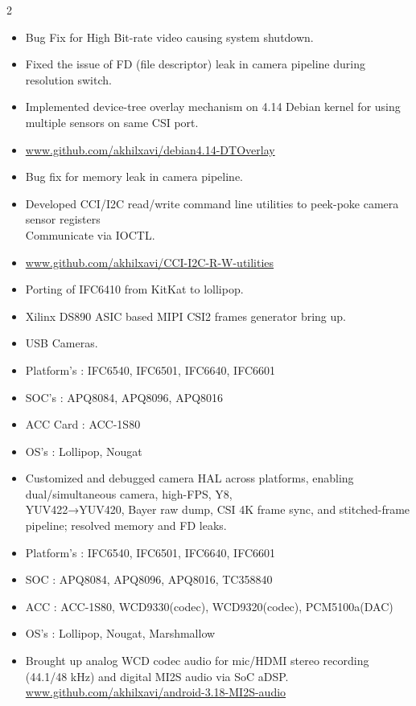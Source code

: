 \documentclass[10pt,a4paper,ragged2e,withhyper]{altacv}
\begin{document}
\begin{paracol}{2}
\begin{itemize}
\switchcolumn

    \item Bug Fix for High Bit-rate video causing system shutdown.
    \item Fixed the issue of FD (file descriptor) leak in camera pipeline during resolution switch.
    \item Implemented device-tree overlay mechanism on 4.14 Debian kernel for using multiple sensors on same CSI port.
    \item \href{www.github.com/akhilxavi/debian4.14-DTOverlay}{www.github.com/akhilxavi/debian4.14-DTOverlay}
    \item  Bug fix for memory leak in camera pipeline.
    \item  Developed CCI/I2C read/write command line utilities to peek-poke camera sensor registers\\
           Communicate via IOCTL.
    \item \href{www.github.com/akhilxavi/CCI-I2C-R-W-utilities}{www.github.com/akhilxavi/CCI-I2C-R-W-utilities}
    \item  Porting of IFC6410 from KitKat to lollipop.
    \item  Xilinx DS890 ASIC based MIPI CSI2 frames generator bring up.
    \item USB Cameras.
\end{itemize}

\begin{itemize}
    \item Platform’s : IFC6540, IFC6501, IFC6640, IFC6601
    \item SOC's : APQ8084, APQ8096, APQ8016
    \item ACC Card : ACC-1S80
    \item OS’s : Lollipop, Nougat
    \item Customized and debugged camera HAL across platforms, enabling dual/simultaneous camera, high-FPS, Y8, \\
          YUV422→YUV420, Bayer raw dump, CSI 4K frame sync, and stitched-frame pipeline; resolved memory and FD leaks.
\end{itemize}

\begin{itemize}
    \item Platform’s : IFC6540, IFC6501, IFC6640, IFC6601
    \item SOC : APQ8084, APQ8096, APQ8016, TC358840
    \item ACC : ACC-1S80, WCD9330(codec), WCD9320(codec), PCM5100a(DAC)
    \item OS’s : Lollipop, Nougat, Marshmallow
    \item Brought up analog WCD codec audio for mic/HDMI stereo recording (44.1/48 kHz) and digital MI2S audio via SoC aDSP. \\
          \href{www.github.com/akhilxavi/android-3.18-MI2S-audio}{www.github.com/akhilxavi/android-3.18-MI2S-audio}
\end{itemize}


\end{paracol}
\end{document}
